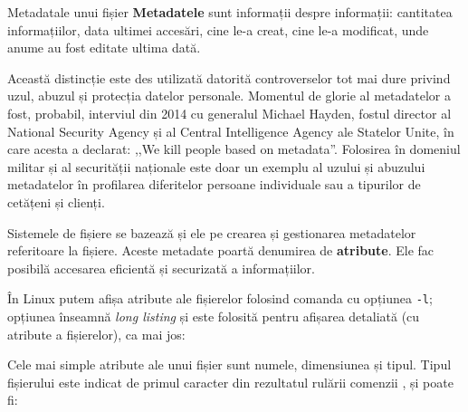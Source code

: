 \begin{definition}{Metadatale unui fișier}
\textbf{Metadatele} sunt informații despre informații: cantitatea informațiilor, data
ultimei accesări, cine le-a creat, cine le-a modificat, unde anume au fost
editate ultima dată.
\end{definition}

Această distincție este des utilizată datorită controverselor tot mai dure
privind uzul, abuzul și protecția datelor personale. Momentul de glorie
al metadatelor a fost, probabil, interviul din 2014 cu generalul Michael Hayden,
fostul director al National Security Agency și al Central Intelligence Agency
ale Statelor Unite, în care acesta a declarat: ,,We kill people based on
metadata''. Folosirea în domeniul militar și al securității naționale este
doar un exemplu al uzului și abuzului metadatelor în profilarea diferitelor
persoane individuale sau a tipurilor de cetățeni și clienți.

Sistemele de fișiere se bazează și ele pe crearea și gestionarea metadatelor referitoare la
fișiere. Aceste metadate poartă denumirea de \textbf{atribute}. Ele fac posibilă accesarea
eficientă și securizată a informațiilor.

În Linux putem afișa atribute ale fișierelor folosind comanda  cu opțiunea \texttt{-l}; opțiunea înseamnă \textit{long listing} și este folosită pentru afișarea detaliată (cu atribute a fișierelor), ca mai jos:


Cele mai simple atribute ale unui fișier sunt numele, dimensiunea și tipul.
Tipul fișierului este indicat de primul caracter din rezultatul rulării comenzii
, și poate fi:

